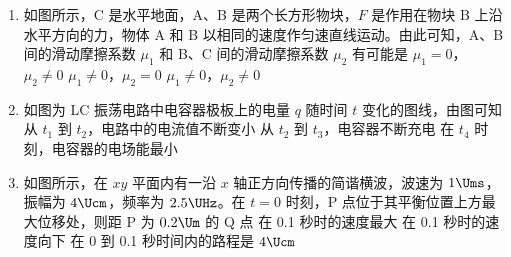 \documentclass[\gkver]{gaokaozhenti}
\begin{document}
\begin{enumerate}
\item
如图所示，C 是水平地面，A、B 是两个长方形物块，$F$ 是作用在物块 B 上沿水平方向的力，物体 A 和 B 以相同的速度作匀速直线运动。由此可知，A、B 间的滑动摩擦系数 $\mu_{1}$ 和 B、C 间的滑动摩擦系数 $\mu_{2}$ 有可能是
\onepicture[w=4.5cm]{}
{$\mu_{1} = 0$，$\mu_{2} \neq 0$}
{$\mu_{1} \neq 0$，$\mu_{2} = 0$}
{$\mu_{1} \neq 0$，$\mu_{2} \neq 0$}


\item
如图为 LC 振荡电路中电容器极板上的电量 $q$ 随时间 $t$ 变化的图线，由图可知
\onepicture[w=4.5cm]{}
{从 $t_{1}$ 到 $t_{2}$，电路中的电流值不断变小}
{从 $t_{2}$ 到 $t_{3}$，电容器不断充电}
{在 $t_{4}$ 时刻，电容器的电场能最小}


\item
如图所示，在 $xy$ 平面内有一沿 $x$ 轴正方向传播的简谐横波，波速为 $1\Ums$，振幅为 $4\Ucm$，频率为 $2.5\UHz$。在 $t=0$ 时刻，P 点位于其平衡位置上方最大位移处，则距 P 为 $0.2\Um$ 的 Q 点
\onepicture[w=4.5cm]{}
{在 0.1 秒时的速度最大}
{在 0.1 秒时的速度向下}
{在 0 到 0.1 秒时间内的路程是 $4\Ucm$}


\end{enumerate}
\end{document}
